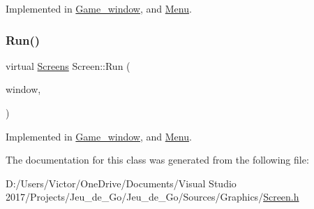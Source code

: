 Implemented in \hyperlink{class_game__window_aafdea9d00265261abfac6ad233b54638}{Game\+\_\+window}, and \hyperlink{class_menu_a7bc75c51f0ae43faeb694b8a0c4c7d16}{Menu}.

\mbox{\label{class_screen_aadaffbe93949a54f04e2a87c5602f610}} 
\subsubsection{\texorpdfstring{Run()}{Run()}}
{\footnotesize\ttfamily virtual \hyperlink{_globals_8h_a3d5776bab98402b03be09156bacf4f68}{Screens} Screen\+::\+Run (\begin{DoxyParamCaption}\item[{sf\+::\+Render\+Window \&}]{window,  }\item[{\hyperlink{class_game__window}{Game\+\_\+window} \&}]{ }\end{DoxyParamCaption})\hspace{0.3cm}{\ttfamily [pure virtual]}}



Implemented in \hyperlink{class_game__window_aec21feecf4c72d73c13d82aa12df6930}{Game\+\_\+window}, and \hyperlink{class_menu_ab8d843dd1787490b96a1e5c70eed5879}{Menu}.



The documentation for this class was generated from the following file\+:\begin{DoxyCompactItemize}
\item 
D\+:/\+Users/\+Victor/\+One\+Drive/\+Documents/\+Visual Studio 2017/\+Projects/\+Jeu\+\_\+de\+\_\+\+Go/\+Jeu\+\_\+de\+\_\+\+Go/\+Sources/\+Graphics/\hyperlink{_screen_8h}{Screen.\+h}\end{DoxyCompactItemize}

